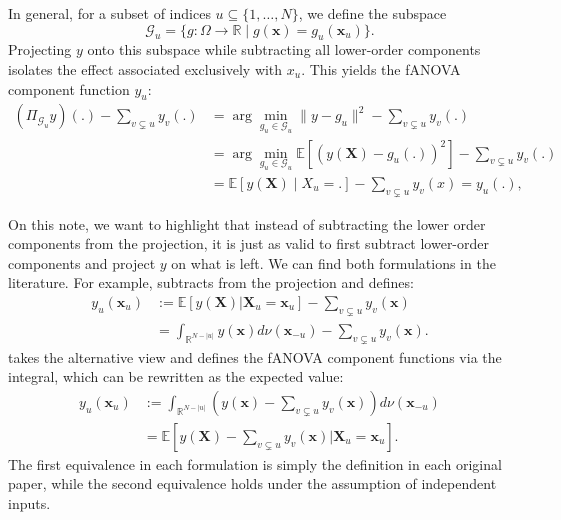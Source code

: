 In general, for a subset of indices $u \subseteq \{1, \dots, N\}$, we define the subspace
\[
\mathcal{G}_u = \{ g : \Omega \to \mathbb{R} \mid g(\boldsymbol{x}) = g_u(\boldsymbol{x}_u)\}.
\]
Projecting $y$ onto this subspace while subtracting all lower-order components 
isolates the effect associated exclusively with $x_u$. This yields the fANOVA component function $y_u$:
\begin{align*}
    (\Pi_{\mathcal{G}_u}y)(.) - \sum_{v \subsetneq u} y_v(.)
    &= \arg \min_{g_u \in \mathcal{G}_u} \|y - g_u\|^2 - \sum_{v \subsetneq u} y_v(.)\\
    &= \arg \min_{g_u \in \mathcal{G}_{u}} \mathbb{E}[(y(\boldsymbol{X}) - g_u(.))^2] - \sum_{v \subsetneq u} y_v(.)\\
    &= \mathbb{E}[y(\boldsymbol{X}) \mid X_{u} = .] - \sum_{v \subsetneq u} y_v(x) = y_u(.),
\end{align*}

On this note, we want to highlight that instead of subtracting the lower order components from the projection, it is just as valid to first subtract lower-order components and project $y$ on what is left.
We can find both formulations in the literature.
For example, \cite{muehlenstaedt2012} subtracts from the projection and defines:
\begin{align*}
    y_u(\boldsymbol{x}_u) &:=
    \mathbb{E}[y(\boldsymbol{X}) | \boldsymbol{X}_{u} = \boldsymbol{x}_u] - \sum_{v \subsetneq u} y_v(\boldsymbol{x}) \\
    &= \int_{\mathbb{R}^{N-|u|}} y(\boldsymbol{x}) d \nu(\boldsymbol{x}_{-u}) - \sum_{v \subsetneq u} y_v(\boldsymbol{x}).
\end{align*}
\cite{hooker2004} takes the alternative view and defines the fANOVA component functions via the integral, which can be rewritten as the expected value:
\begin{align*}
    y_u(\boldsymbol{x}_u)
    &:= \int_{\mathbb{R}^{N-|u|}} (y(\boldsymbol{x}) - \sum_{v \subsetneq u} y_v(\boldsymbol{x})) d \nu(\boldsymbol{x}_{-u}) \\
    &= \mathbb{E}[y(\boldsymbol{X}) - \sum_{v \subsetneq u} y_v(\boldsymbol{x}) | \boldsymbol{X}_{u} = \boldsymbol{x}_u ].
\end{align*}
The first equivalence in each formulation is simply the definition in each original paper, while the second equivalence holds under the assumption of independent inputs.


